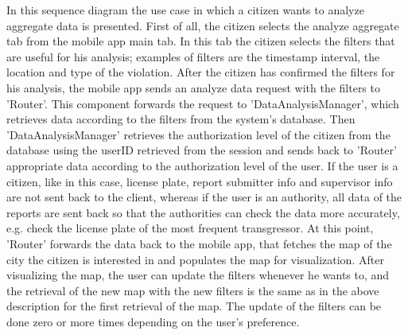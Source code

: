 In this sequence diagram the use case in which a citizen wants to analyze aggregate data is presented. First of all, the citizen selects the analyze aggregate tab from the mobile app main tab. In this tab the citizen selects the filters that are useful for his analysis; examples of filters are the timestamp interval, the location 	and type of the violation. After the citizen has confirmed the filters for his analysis, the mobile app sends an analyze data request with the filters to 'Router'. This component forwards the request to 'DataAnalysisManager', which retrieves data according to the filters from the system's database. Then 'DataAnalysisManager' retrieves the authorization level of the citizen from the database using the userID retrieved from the session and sends back to 'Router' appropriate data according to the authorization level of the user. If the user is a citizen, like in this case, license plate, report submitter info and supervisor info are not sent back to the client, whereas if the user is an authority, all data of the reports are sent back so that the authorities can check the data more accurately, e.g. check the license plate of the most frequent transgressor. At this point, 'Router' forwards the data back to the mobile app, that fetches the map of the city the citizen is interested in and populates the map for visualization. After visualizing the map, the user can update the filters whenever he wants to, and the retrieval of the new map with the new filters is the same as in the above description for the first retrieval of the map. The update of the filters can be done zero or more times depending on the user's preference.

